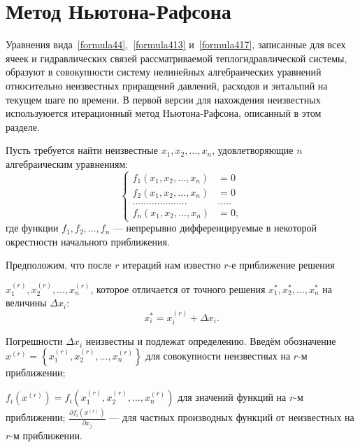 
\section{Метод Ньютона-Рафсона}
\label{sec:section5}
Уравнения вида~\eqref{formula44},~\eqref{formula413} и~\eqref{formula417}, записанные для всех ячеек и гидравлических связей рассматриваемой теплогидравлической системы, образуют в совокупности систему нелинейных алгебраических уравнений относительно неизвестных приращений давлений, расходов и энтальпий на текущем шаге по времени. В первой версии для нахождения неизвестных используюется итерационный метод Ньютона-Рафсона, описанный в этом разделе.

Пусть требуется найти неизвестные $x_1, x_2, \dots, x_n$, удовлетворяющие $n$ ал\-геб\-ра\-и\-чес\-ким уравнениям:
\begin{equation}
\label{formula51}
\left\{
\begin{aligned}
f_1(x_1,x_2,\dots,x_n) & = 0 \\
f_2(x_1,x_2,\dots,x_n) & = 0 \\
.................... & ..... \\
f_n(x_1,x_2,\dots,x_n) & = 0,
\end{aligned}
\right.
\end{equation}
где функции $f_1,f_2,\dots,f_n$ --- непрерывно дифференцируемые в некоторой окрестности начального приближения. 

Предположим, что после $r$ итераций нам известно $r$-е приближение решения

\noindent $x_1^{(r)},x_2^{(r)},\dots,x_n^{(r)}$, которое отличается от точного решения $x_1^{*}, x_2^{*}, \dots, x_n^{*}$ на величины $\Delta x_i$:
\begin{equation}
\label{formula52}
x_i^{*}=x_i^{(r)}+\Delta x_i.
\end{equation}

Погрешности $\Delta x_i$ неизвестны и подлежат определению. Введём обозначение \\ $x^{(r)}=\left\{x_1^{(r)},x_2^{(r)},\dots,x_n^{(r)}\right\}$ для совокупности неизвестных на $r$-м приближении;

\noindent $f_i\left(x^{(r)}\right)=f_i\left(x_1^{(r)},x_2^{(r)},\dots,x_n^{(r)}\right)$ для значений функций на $r$-м приближении; $\frac{\partial f_i\left(x^{(r)}\right)}{\partial x_j}$ --- для частных производных функций от неизвестных на $r$-м приближении. 

